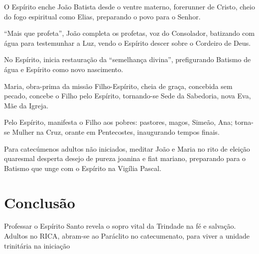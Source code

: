 O Espírito enche João Batista desde o ventre materno, forerunner de Cristo, cheio do fogo espiritual como Elias, preparando o povo para o Senhor.

``Mais que profeta'', João completa os profetas, voz do Consolador, batizando com água para testemunhar a Luz, vendo o Espírito descer sobre o Cordeiro de Deus.

No Espírito, inicia restauração da ``semelhança divina'', prefigurando Batismo de água e Espírito como novo nascimento.

Maria, obra-prima da missão Filho-Espírito, cheia de graça, concebida sem pecado, concebe o Filho pelo Espírito, tornando-se Sede da Sabedoria, nova Eva, Mãe da Igreja.

Pelo Espírito, manifesta o Filho aos pobres: pastores, magos, Simeão, Ana; torna-se Mulher na Cruz, orante em Pentecostes, inaugurando tempos finais.

Para catecúmenos adultos não iniciados, meditar João e Maria no rito de eleição quaresmal desperta desejo de pureza joanina e fiat mariano, preparando para o Batismo que unge com o Espírito na Vigília Pascal.

\section{Conclusão}

Professar o Espírito Santo revela o sopro vital da Trindade na fé e salvação. Adultos no RICA, abram-se ao Paráclito no catecumenato, para viver a unidade trinitária na iniciação